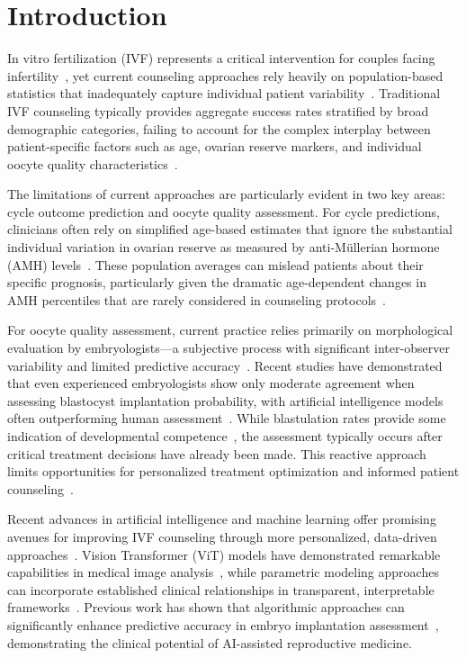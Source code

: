 \section{Introduction}\label{sec:introduction}

In vitro fertilization (IVF) represents a critical intervention for couples facing infertility~\cite{hfea2024statistics,sart2024national}, yet current counseling approaches rely heavily on population-based statistics that inadequately capture individual patient variability~\cite{gameiro2023understanding}. Traditional IVF counseling typically provides aggregate success rates stratified by broad demographic categories, failing to account for the complex interplay between patient-specific factors such as age, ovarian reserve markers, and individual oocyte quality characteristics~\cite{asrm2017embryo}.

The limitations of current approaches are particularly evident in two key areas: cycle outcome prediction and oocyte quality assessment. For cycle predictions, clinicians often rely on simplified age-based estimates that ignore the substantial individual variation in ovarian reserve as measured by anti-Müllerian hormone (AMH) levels~\cite{seifer2002amh,ovarian_reserve_testing}. These population averages can mislead patients about their specific prognosis, particularly given the dramatic age-dependent changes in AMH percentiles that are rarely considered in counseling protocols~\cite{lee2017amh,song2021amh}.

For oocyte quality assessment, current practice relies primarily on morphological evaluation by embryologists—a subjective process with significant inter-observer variability and limited predictive accuracy~\cite{paternot2009observer,paternot2011multicentre,fordham2022embryologist}. Recent studies have demonstrated that even experienced embryologists show only moderate agreement when assessing blastocyst implantation probability, with artificial intelligence models often outperforming human assessment~\cite{fordham2022embryologist}. While blastulation rates provide some indication of developmental competence~\cite{zhu2024developmental}, the assessment typically occurs after critical treatment decisions have already been made. This reactive approach limits opportunities for personalized treatment optimization and informed patient counseling~\cite{racowsky2010standardization}.

Recent advances in artificial intelligence and machine learning offer promising avenues for improving IVF counseling through more personalized, data-driven approaches~\cite{litjens2017survey,zhang2021machine}. Vision Transformer (ViT) models have demonstrated remarkable capabilities in medical image analysis~\cite{dosovitskiy2021image,alhammuri2023vision}, while parametric modeling approaches can incorporate established clinical relationships in transparent, interpretable frameworks~\cite{rudin2019stop}. Previous work has shown that algorithmic approaches can significantly enhance predictive accuracy in embryo implantation assessment~\cite{rave2024bonna}, demonstrating the clinical potential of AI-assisted reproductive medicine.

